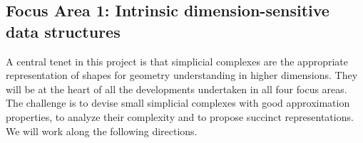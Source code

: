 \subsection*{Focus Area 1:  Intrinsic dimension-sensitive data structures} 

A central tenet in this project is that simplicial complexes are the appropriate representation of shapes for geometry understanding in higher dimensions.  They will be at the heart of all the developments undertaken in all four focus areas.  The challenge is to devise small simplicial complexes with good approximation properties, to analyze their complexity and to propose succinct representations. We will work along the following directions.







